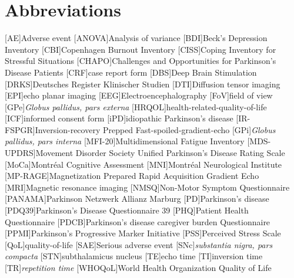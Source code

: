 \chapter*{Abbreviations}
\let\oldbaselinestretch=\baselinestretch%
\renewcommand{\baselinestretch}{1}%
\large\normalsize%
\thispagestyle{plain}
\begin{multicols}{2}
\begin{acronym}
\setlength{\parskip}{0ex}
[AE]{Adverse event}
[ANOVA]{Analysis of variance}
[BDI]{Beck's Depression Inventory}
[CBI]{Copenhagen Burnout Inventory}
[CISS]{Coping Inventory for Stressful Situations}
[CHAPO]{Challenges and Opportunities for Parkinson's Disease Patients}
[CRF]{case report form}
[DBS]{Deep Brain Stimulation}
[DRKS]{Deutsches Register Klinischer Studien}
[DTI]{Diffusion tensor imaging}
[EPI]{echo planar imaging}
[EEG]{Electroencephalography}
[FoV]{field of view}
[GPe]{\textit{Globus pallidus, pars externa}}
[HRQOL]{health-related-quality-of-life}
[ICF]{informed consent form}
[iPD]{idiopathic Parkinson's disease}
[IR-FSPGR]{Inversion-recovery Prepped Fast-spoiled-gradient-echo}
[GPi]{\textit{Globus pallidus, pars interna}}
[MFI-20]{Multidimensional Fatigue Inventory}
[MDS-UPDRS]{Movement Disorder Society Unified Parkinson's Disease Rating Scale}
[MoCa]{Montréal Cognitive Assessment}
[MNI]{Montréal Neurological Institute}
[MP-RAGE]{Magnetization Prepared Rapid Acquisition Gradient Echo}
[MRI]{Magnetic resonance imaging}
[NMSQ]{Non-Motor Symptom Questionnaire}
[PANAMA]{Parkinson Netzwerk Allianz Marburg}
[PD]{Parkinson's disease}
[PDQ39]{Parkinson's Disease Questionnaire 39}
[PHQ]{Patient Health Questionnaire}
[PDCB]{Parkinson’s disease caregiver burden Questionnaire}
[PPMI]{Parkinson's Progressive Marker Initiative}
[PSS]{Perceived Stress Scale}
[QoL]{quality-of-life}
[SAE]{Serious adverse event}
[SNc]{\textit{substantia nigra, pars compacta}}
[STN]{subthalamicus nucleus}
[TE]{echo time}
[TI]{inversion time}
[TR]{\textit{repetition time}}
[WHOQoL]{World Health Organization Quality of Life}
\end{acronym}
\renewcommand{\baselinestretch}{\oldbaselinestretch}%
\large\normalsize%
\end{multicols}
